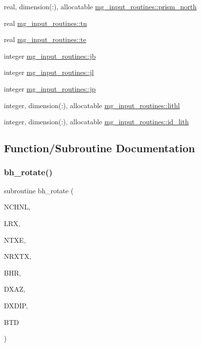 \begin{DoxyCompactItemize}
\item 
real, dimension(\+:), allocatable \hyperlink{namespacemg__input__routines_a45032fedf20c6d2a1f01df582b86333a}{mg\+\_\+input\+\_\+routines\+::prism\+\_\+north}
\item 
real \hyperlink{namespacemg__input__routines_aca72cc45f4f3c7ec515d367a2a6ee659}{mg\+\_\+input\+\_\+routines\+::tn}
\item 
real \hyperlink{namespacemg__input__routines_a851abd44c498519b419cf1ccdab8640f}{mg\+\_\+input\+\_\+routines\+::te}
\item 
integer \hyperlink{namespacemg__input__routines_ad6477edd6c31520d925c6962ec2a7248}{mg\+\_\+input\+\_\+routines\+::jb}
\item 
integer \hyperlink{namespacemg__input__routines_ac9c41f20a75b4f15a95c79ffcbf655db}{mg\+\_\+input\+\_\+routines\+::jl}
\item 
integer \hyperlink{namespacemg__input__routines_a03f300f92ef7ffa2899bc4a7623805e6}{mg\+\_\+input\+\_\+routines\+::jp}
\item 
integer, dimension(\+:), allocatable \hyperlink{namespacemg__input__routines_a5bfda764a44cea47087fc53cd4d756d0}{mg\+\_\+input\+\_\+routines\+::lithl}
\item 
integer, dimension(\+:), allocatable \hyperlink{namespacemg__input__routines_a32db71951a8a9e2fd94dd117598cdeb6}{mg\+\_\+input\+\_\+routines\+::id\+\_\+lith}
\end{DoxyCompactItemize}


\subsection{Function/\+Subroutine Documentation}
\mbox{\label{Marco_8f90_a6f9b11cb7ed99f525d6b03e1b3223dee}} 
\subsubsection{\texorpdfstring{bh\+\_\+rotate()}{bh\_rotate()}}
{\footnotesize\ttfamily subroutine bh\+\_\+rotate (\begin{DoxyParamCaption}\item[{integer}]{N\+C\+H\+NL,  }\item[{integer}]{L\+RX,  }\item[{integer}]{N\+T\+XE,  }\item[{integer, dimension(ntxe)}]{N\+R\+X\+TX,  }\item[{logical, dimension(lrx,ntxe)}]{B\+HR,  }\item[{real, dimension(lrx,ntxe)}]{D\+X\+AZ,  }\item[{real, dimension(lrx,ntxe)}]{D\+X\+D\+IP,  }\item[{real, dimension(nchnl,lrx,ntxe,3)}]{B\+TD }\end{DoxyParamCaption})}

